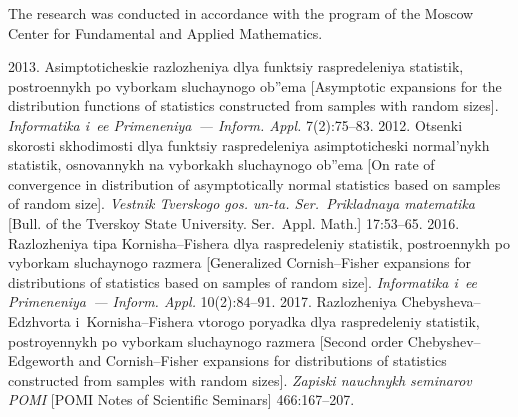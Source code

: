 




 \Ack
\noindent
The research was conducted in accordance with the program of the Moscow Center for Fundamental 
and Applied Mathematics.


  \begin{multicols}{2}

\renewcommand{\bibname}{\protect\rmfamily References}

{\small\frenchspacing
 {%
 \begin{thebibliography}{9}
 2013. Asimptoticheskie razlozheniya dlya funktsiy raspredeleniya statistik, 
 postroennykh po vyborkam sluchaynogo ob''ema [Asymptotic expansions for the distribution functions 
 of statistics constructed from samples with random sizes]. 
 \textit{Informatika i~ee Primeneniya~--- Inform. Appl.} 7(2):75--83.
 2012. Otsenki skorosti skhodimosti dlya funktsiy raspredeleniya asimptoticheski normal'nykh 
 statistik, osnovannykh na vyborkakh sluchaynogo ob''ema [On rate of convergence in distribution 
 of asymptotically normal statistics based on samples of random size]. 
 \textit{Vestnik Tverskogo gos. un-ta. Ser.\ Prikladnaya matematika} 
 [Bull. of the Tverskoy State University. Ser.\ Appl. Math.] 17:53--65.
 2016. Razlozheniya tipa Kornisha--Fishera dlya raspredeleniy statistik, 
 postroennykh po vyborkam sluchaynogo razmera [Generalized Cornish--Fisher expansions 
 for distributions of statistics based on samples of random size]. 
  \textit{Informatika i~ee Primeneniya~--- Inform. Appl.} 10(2):84--91.
 2017. Razlozheniya Chebysheva--Edzhvorta i~Kornisha--Fishera vtorogo poryadka dlya raspredeleniy 
 statistik, postroyennykh po vyborkam sluchaynogo razmera [Second order Chebyshev--Edgeworth and 
 Cornish--Fisher expansions for distributions of statistics constructed from samples with random sizes]. 
  \textit{Zapiski nauchnykh seminarov POMI} [POMI Notes of Scientific Seminars] 466:167--207.
  {
  
}
\end{thebibliography}}}
\end{multicols}
